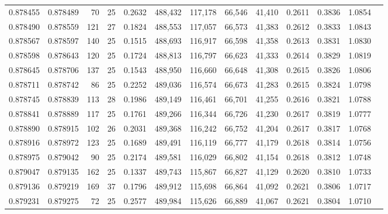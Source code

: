\begin{tabular}{rrrrrrrrrrrrr}
0.878455 & 0.878489 &    70 &  25 &                                     0.2632 & 488,432 & 117,178 &  66,546 &  41,410 & 0.2611 & 0.3836 & 1.0854 \\
0.878490 & 0.878559 &   121 &  27 &                                     0.1824 & 488,553 & 117,057 &  66,573 &  41,383 & 0.2612 & 0.3833 & 1.0843 \\
0.878567 & 0.878597 &   140 &  25 &                                     0.1515 & 488,693 & 116,917 &  66,598 &  41,358 & 0.2613 & 0.3831 & 1.0830 \\
0.878598 & 0.878643 &   120 &  25 &                                     0.1724 & 488,813 & 116,797 &  66,623 &  41,333 & 0.2614 & 0.3829 & 1.0819 \\
0.878645 & 0.878706 &   137 &  25 &                                     0.1543 & 488,950 & 116,660 &  66,648 &  41,308 & 0.2615 & 0.3826 & 1.0806 \\
0.878711 & 0.878742 &    86 &  25 &                                     0.2252 & 489,036 & 116,574 &  66,673 &  41,283 & 0.2615 & 0.3824 & 1.0798 \\
0.878745 & 0.878839 &   113 &  28 &                                     0.1986 & 489,149 & 116,461 &  66,701 &  41,255 & 0.2616 & 0.3821 & 1.0788 \\
0.878841 & 0.878889 &   117 &  25 &                                     0.1761 & 489,266 & 116,344 &  66,726 &  41,230 & 0.2617 & 0.3819 & 1.0777 \\
0.878890 & 0.878915 &   102 &  26 &                                     0.2031 & 489,368 & 116,242 &  66,752 &  41,204 & 0.2617 & 0.3817 & 1.0768 \\
0.878916 & 0.878972 &   123 &  25 &                                     0.1689 & 489,491 & 116,119 &  66,777 &  41,179 & 0.2618 & 0.3814 & 1.0756 \\
0.878975 & 0.879042 &    90 &  25 &                                     0.2174 & 489,581 & 116,029 &  66,802 &  41,154 & 0.2618 & 0.3812 & 1.0748 \\
0.879047 & 0.879135 &   162 &  25 &                                     0.1337 & 489,743 & 115,867 &  66,827 &  41,129 & 0.2620 & 0.3810 & 1.0733 \\
0.879136 & 0.879219 &   169 &  37 &                                     0.1796 & 489,912 & 115,698 &  66,864 &  41,092 & 0.2621 & 0.3806 & 1.0717 \\
0.879231 & 0.879275 &    72 &  25 &                                     0.2577 & 489,984 & 115,626 &  66,889 &  41,067 & 0.2621 & 0.3804 & 1.0710 \\

\end{tabular}
